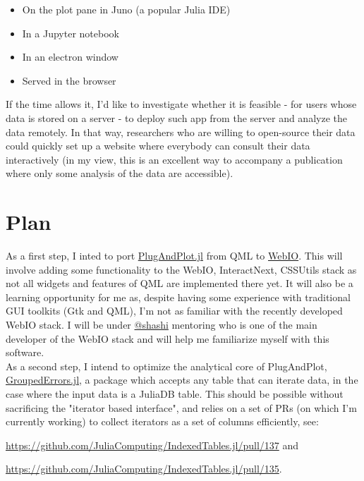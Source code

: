 \documentclass[10pt,a4paper]{report}
\begin{document}
\begin{itemize}
    \item On the plot pane in Juno (a popular Julia IDE)
    \item In a Jupyter notebook
    \item In an electron window
    \item Served in the browser
\end{itemize}

If the time allows it, I'd like to investigate whether it is feasible - for users whose data is stored on a server - to deploy such app from the server and analyze the data remotely. In that way, researchers who are willing to open-source their data could quickly set up a website where everybody can consult their data interactively (in my view, this is an excellent way to accompany a publication where only some analysis of the data are accessible).

\section*{Plan}

As a first step, I inted to port \href{https://github.com/piever/PlugAndPlot.jl}{PlugAndPlot.jl} from QML to \href{https://github.com/JuliaGizmos/WebIO.jl}{WebIO}. This will involve adding some functionality to the WebIO, InteractNext, CSSUtils stack as not all widgets and features of QML are implemented there yet. It will also be a learning opportunity for me as, despite having some experience with traditional GUI toolkits (Gtk and QML), I'm not as familiar with the recently developed WebIO stack. I will be under \href{https://github.com/shashi}{@shashi} mentoring who is one of the main developer of the WebIO stack and will help me familiarize myself with this software. \\

As a second step, I intend to optimize the analytical core of PlugAndPlot, \href{https://github.com/piever/GroupedErrors.jl}{GroupedErrors.jl}, a package which accepts any table that can iterate data, in the case where the input data is a JuliaDB table. This should be possible without sacrificing the "iterator based interface", and relies on a set of PRs (on which I'm currently working) to collect iterators as a set of columns efficiently, see:

 \url{https://github.com/JuliaComputing/IndexedTables.jl/pull/137} and

  \url{https://github.com/JuliaComputing/IndexedTables.jl/pull/135}.\\
\end{document}
